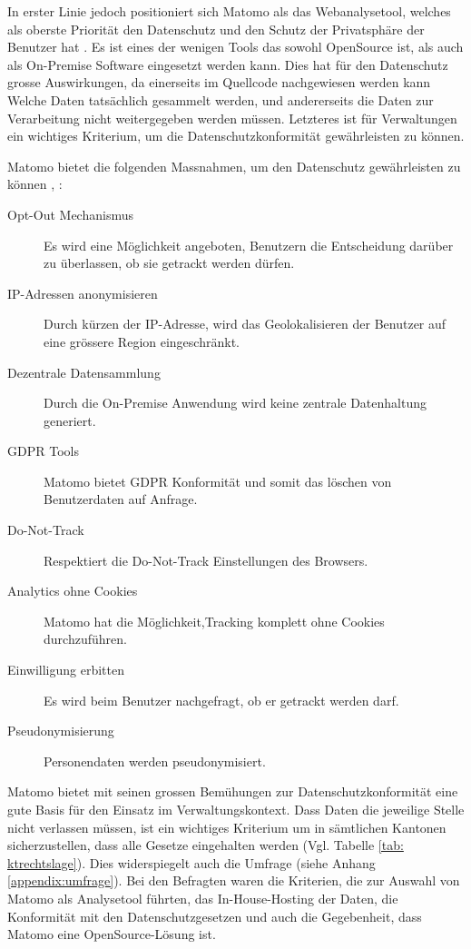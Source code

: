 In erster Linie jedoch positioniert sich Matomo als das Webanalysetool, welches als oberste Priorität den Datenschutz und den Schutz der Privatsphäre der Benutzer hat \parencite{MamotoPrivacy}. Es ist eines der wenigen Tools das sowohl OpenSource ist, als auch als On-Premise Software eingesetzt werden kann. Dies hat für den Datenschutz grosse Auswirkungen, da einerseits im Quellcode nachgewiesen werden kann Welche Daten tatsächlich gesammelt werden, und andererseits die Daten zur Verarbeitung nicht weitergegeben werden müssen. Letzteres ist für Verwaltungen ein wichtiges Kriterium, um die Datenschutzkonformität gewährleisten zu können.

Matomo bietet die folgenden Massnahmen, um den Datenschutz gewährleisten zu können \parencite{MamotoFeatures}, \parencite{MamotoPrivacy}:

\begin{description}
  \item[Opt-Out Mechanismus] Es wird eine Möglichkeit angeboten, Benutzern die Entscheidung darüber zu überlassen, ob sie getrackt werden dürfen.
  \item[IP-Adressen anonymisieren] Durch kürzen der IP-Adresse, wird das Geolokalisieren der Benutzer auf eine grössere Region eingeschränkt.
  \item[Dezentrale Datensammlung] Durch die On-Premise  Anwendung wird keine zentrale Datenhaltung generiert.
  \item[GDPR Tools] Matomo bietet GDPR Konformität und somit das löschen von Benutzerdaten auf Anfrage.  
  \item[Do-Not-Track] Respektiert die Do-Not-Track Einstellungen des Browsers.
  \item[Analytics ohne Cookies] Matomo hat die Möglichkeit,Tracking komplett ohne Cookies durchzuführen.
  \item[Einwilligung erbitten] Es wird beim Benutzer nachgefragt, ob er getrackt werden darf.
  \item[Pseudonymisierung] Personendaten werden pseudonymisiert.  
\end{description}

Matomo bietet mit seinen grossen Bemühungen zur Datenschutzkonformität eine gute Basis für den Einsatz im Verwaltungskontext. Dass Daten die jeweilige Stelle nicht verlassen müssen, ist ein wichtiges Kriterium um in sämtlichen Kantonen sicherzustellen, dass alle Gesetze eingehalten werden (Vgl. Tabelle \ref{tab: ktrechtslage}). Dies widerspiegelt auch die Umfrage (siehe Anhang \ref{appendix:umfrage}). Bei den Befragten waren die Kriterien, die zur Auswahl von Matomo als Analysetool führten, das In-House-Hosting der Daten, die Konformität mit den Datenschutzgesetzen und auch die Gegebenheit, dass Matomo eine OpenSource-Lösung ist.  

